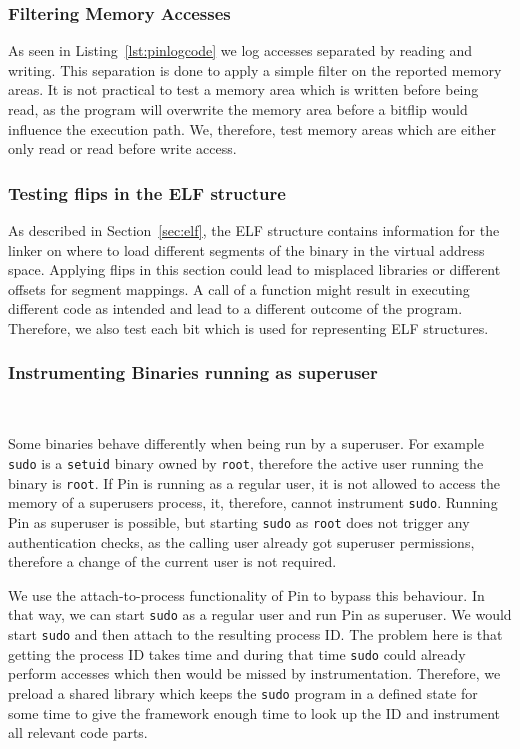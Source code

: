 \subsubsection{Filtering Memory Accesses}

As seen in Listing~\ref{lst:pinlogcode} we log accesses separated by reading and
writing. This separation is done to apply a simple filter on the reported memory
areas. It is not practical to test a memory area which is written before being
read, as the program will overwrite the memory area before a bitflip would
influence the execution path. We, therefore, test memory areas which are either
only read or read before write access.

\subsubsection{Testing flips in the ELF structure}

As described in Section~\ref{sec:elf}, the ELF structure contains information
for the linker on where to load different segments of the binary in the virtual
address space. Applying flips in this section could lead to misplaced libraries
or different offsets for segment mappings. A call of a function might result in
executing different code as intended and lead to a different outcome of the
program. Therefore, we also test each bit which is used for representing ELF
structures.

\subsubsection{Instrumenting Binaries running as superuser}
~\label{sec:setuidfix}

Some binaries behave differently when being run by a superuser. For example
\texttt{sudo} is a \texttt{setuid} binary owned by \texttt{root}, therefore the
active user running the binary is \texttt{root}. If Pin is running as a regular
user, it is not allowed to access the memory of a superuser\textquotesingle s
process, it, therefore, cannot instrument \texttt{sudo}. Running Pin as
superuser is possible, but starting \texttt{sudo} as \texttt{root} does not
trigger any authentication checks, as the calling user already got superuser
permissions, therefore a change of the current user is not required.

We use the attach-to-process functionality of Pin to bypass this behaviour. In
that way, we can start \texttt{sudo} as a regular user and run Pin as superuser.
We would start \texttt{sudo} and then attach to the resulting process ID. The
problem here is that getting the process ID takes time and during that time
\texttt{sudo} could already perform accesses which then would be missed by
instrumentation. Therefore, we preload a shared library which keeps the
\texttt{sudo} program in a defined state for some time to give the framework
enough time to look up the ID and instrument all relevant code parts.

